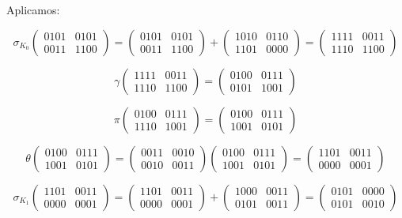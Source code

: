 \documentclass[a4paper]{article}
\begin{document}
Aplicamos:

$$\sigma_{K_0} \begin{pmatrix} 0101 & 0101 \\ 0011 & 1100 \end{pmatrix} = \begin{pmatrix} 0101 & 0101 \\ 0011 & 1100 \end{pmatrix} + \begin{pmatrix} 1010 & 0110 \\ 1101 & 0000 \end{pmatrix} = \begin{pmatrix} 1111 & 0011 \\ 1110 & 1100 \end{pmatrix}$$

$$\gamma \begin{pmatrix} 1111 & 0011 \\ 1110 & 1100 \end{pmatrix} = \begin{pmatrix} 0100 & 0111 \\ 0101 & 1001 \end{pmatrix}$$

$$\pi \begin{pmatrix} 0100 & 0111 \\ 1110 & 1001 \end{pmatrix} = \begin{pmatrix} 0100 & 0111 \\ 1001 & 0101 \end{pmatrix}$$

$$\theta \begin{pmatrix} 0100 & 0111 \\ 1001 & 0101 \end{pmatrix} = \begin{pmatrix} 0011 & 0010 \\ 0010 & 0011 \end{pmatrix}\begin{pmatrix} 0100 & 0111 \\ 1001 & 0101 \end{pmatrix} = \begin{pmatrix} 1101 & 0011 \\ 0000 & 0001 \end{pmatrix}$$

$$\sigma_{K_1} \begin{pmatrix} 1101 & 0011 \\ 0000 & 0001 \end{pmatrix} = \begin{pmatrix} 1101 & 0011 \\ 0000 & 0001 \end{pmatrix} + \begin{pmatrix} 1000 & 0011 \\ 0101 & 0011 \end{pmatrix} = \begin{pmatrix} 0101 & 0000 \\ 0101 & 0010 \end{pmatrix}$$
\end{document}
